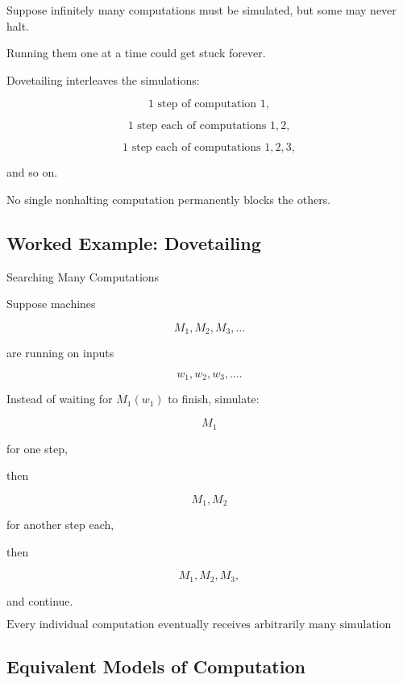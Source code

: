Suppose infinitely many computations must be simulated, but some may never
halt.

Running them one at a time could get stuck forever.

Dovetailing interleaves the simulations:

\[
\boxed{
1\text{ step of computation }1,
}
\]

\[
\boxed{
1\text{ step each of computations }1,2,
}
\]

\[
\boxed{
1\text{ step each of computations }1,2,3,
}
\]

and so on.

No single nonhalting computation permanently blocks the others.

\subsection{Worked Example: Dovetailing}
\label{subsec:worked-dovetailing}

\begin{workedexamplebox}{Searching Many Computations}

Suppose machines

\[
M_1,M_2,M_3,\ldots
\]

are running on inputs

\[
w_1,w_2,w_3,\ldots.
\]

Instead of waiting for \(M_1(w_1)\) to finish, simulate:

\[
M_1
\]

for one step,

then

\[
M_1,M_2
\]

for another step each,

then

\[
M_1,M_2,M_3,
\]

and continue.

\begin{answerbox}
\[
\boxed{
\text{Every individual computation eventually receives arbitrarily many
simulation steps.}
}
\]
\end{answerbox}

\end{workedexamplebox}

\subsection{Equivalent Models of Computation}
\label{subsec:equivalent-computation-models}

